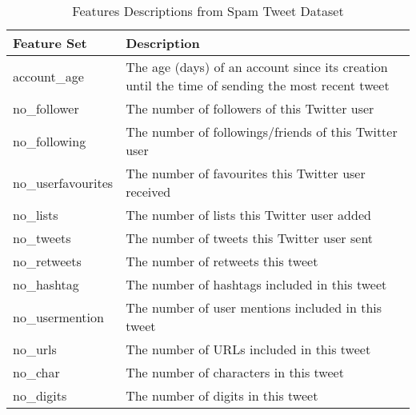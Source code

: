 \documentclass[letterpaper,twocolumn,fleqn]{article}
\begin{document}
\vspace{10pt} %
\begin{table}[!h]
  \caption{Features Descriptions from Spam Tweet Dataset\cite{chen6MillionSpam2015,chenTwitterSpam}}
  \label{tab:features}
  \begin{center}       
    \begin{tabular}{p{} p{}}
      \textbf{Feature Set} & \textbf{Description}                                                                            \\ \hline
      account\_age         & The age (days) of an account since its creation until the time of sending the most recent tweet \\ \hline
      no\_follower         & The number of followers of this Twitter user                                                    \\ \hline
      no\_following        & The number of followings/friends of this Twitter user                                           \\ \hline
      no\_userfavourites   & The number of favourites this Twitter user received                                             \\ \hline
      no\_lists            & The number of lists this Twitter user added                                                     \\ \hline
      no\_tweets           & The number of tweets this Twitter user sent                                                     \\ \hline
      no\_retweets         & The number of retweets this tweet                                                               \\ \hline
      no\_hashtag          & The number of hashtags included in this tweet                                                   \\ \hline
      no\_usermention      & The number of user mentions included in this tweet                                              \\ \hline
      no\_urls             & The number of URLs included in this tweet                                                       \\ \hline
      no\_char             & The number of characters in this tweet                                                          \\ \hline
      no\_digits           & The number of digits in this tweet                                                              \\ 
    \end{tabular}
  \end{center}
\end{table}
\end{document}
